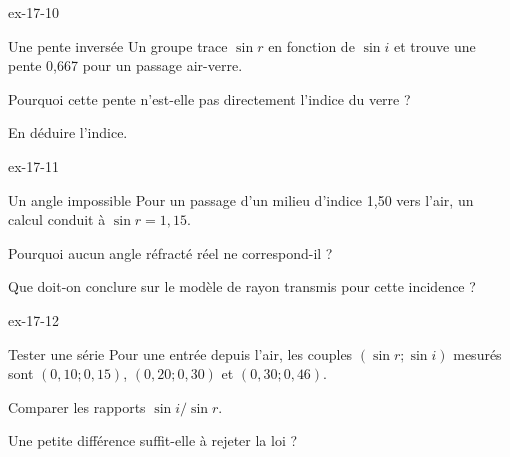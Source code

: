 \begin{blocLivre}{ex-17-10}\begin{exercice}[3]{Une pente inversée}
Un groupe trace $\sin r$ en fonction de $\sin i$ et trouve une pente 0,667 pour un passage air-verre.
\begin{questions}
\item Pourquoi cette pente n’est-elle pas directement l’indice du verre ?
\item En déduire l’indice.
\end{questions}
\end{exercice}\end{blocLivre}
\begin{blocLivre}{ex-17-11}\begin{exercice}[3]{Un angle impossible}
Pour un passage d’un milieu d’indice 1,50 vers l’air, un calcul conduit à $\sin r=1,15$.
\begin{questions}
\item Pourquoi aucun angle réfracté réel ne correspond-il ?
\item Que doit-on conclure sur le modèle de rayon transmis pour cette incidence ?
\end{questions}
\end{exercice}\end{blocLivre}
\begin{blocLivre}{ex-17-12}\begin{exercice}[3]{Tester une série}
Pour une entrée depuis l’air, les couples $(\sin r;\sin i)$ mesurés sont $(0,10;0,15)$, $(0,20;0,30)$ et $(0,30;0,46)$.
\begin{questions}
\item Comparer les rapports $\sin i/\sin r$.
\item Une petite différence suffit-elle à rejeter la loi ?
\end{questions}
\end{exercice}\end{blocLivre}

